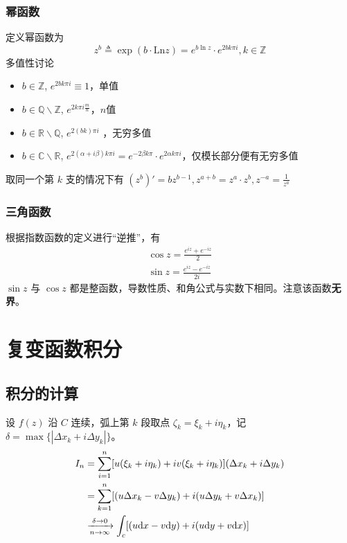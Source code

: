 \documentclass[./main.tex]{subfiles}
\begin{document}
\subsubsection{幂函数}
定义幂函数为
\begin{equation}
    z^b\triangleq\exp(b\cdot\text{Ln}z)=e^{b\ln z}\cdot e^{2bk\pi i},k\in\mathbb{Z}
\end{equation}
多值性讨论
\begin{itemize}
    \item $b\in \mathbb{Z}$, $e^{2bk\pi i}\equiv 1$，单值
    \item $b\in \mathbb{Q}\backslash\mathbb{Z}$, $e^{2k\pi i\frac{m}{n}}$，$n$值
    \item $b\in \mathbb{R}\backslash\mathbb{Q}$, $e^{2(bk)\pi i}$ ，无穷多值
    \item $b\in \mathbb{C}\backslash\mathbb{R}$, $e^{2(\alpha+i\beta)k\pi i}=e^{-2\beta k\pi}\cdot e^{2\alpha k\pi i}$，仅模长部分便有无穷多值
\end{itemize}
取同一个第 $k$ 支的情况下有 $(z^b)'=bz^{b-1},z^{a+b}=z^a\cdot z^b,z^{-a}=\frac{1}{z^a}$
\subsubsection{三角函数}
根据指数函数的定义进行“逆推”，有
\begin{gather}
    \cos z=\frac{e^{iz}+e^{-iz}}{2}\\
    \sin z=\frac{e^{iz}-e^{-iz}}{2i}
\end{gather}
$\sin z$ 与 $\cos z$ 都是整函数，导数性质、和角公式与实数下相同。注意该函数\textbf{无界}。
\section{复变函数积分}
\subsection{积分的计算}
设 $f(z)$ 沿 $C$ 连续，弧上第 $k$ 段取点 $\zeta_k=\xi_k+i\eta_k$，记 $\delta=\max\{|\Delta x_k+i\Delta y_k|\}$。
\begin{align}\label{int:calc}
    I_n&=\sum_{i=1}^{n}[u(\xi_k+i\eta_k)+iv(\xi_k+i\eta_k)](\Delta x_k+i\Delta y_k)\notag\\
    &=\sum_{k=1}^n[(u\Delta x_k-v\Delta y_k)+i(u\Delta y_k+v\Delta x_k)]\notag\\
    &\xrightarrow[n\rightarrow\infty]{\delta\rightarrow 0}\int_c[(u\text{d}x-v\text{d}y)+i(u\text{d}y+v\text{d}x)]
\end{align}
\end{document}
